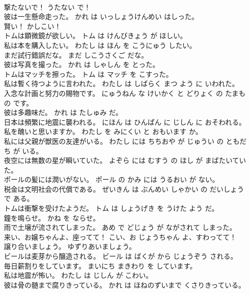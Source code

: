 \documentclass[8pt]{extreport}
\begin{document}
\begin{CJK}{UTF8}{min}
\\	撃たないで！	うたない で！	
\\	彼は一生懸命走った。	かれ は いっしょうけんめい はしった。	
\\	賢い！	かしこい！	
\\	トムは顕微鏡が欲しい。	トム は けんびきょう が ほしい。	
\\	私は本を購入したい。	わたし は ほん を こうにゅう したい。	
\\	まだ試行錯誤だな。	まだ しこうさくご だな。	
\\	彼は写真を撮った。	かれ は しゃしん を とった。	
\\	トムはマッチを擦った。	トム は マッチ を こすった。	
\\	私は暫く待つように言われた。	わたし は しばらく まつ よう に いわれた。	
\\	入念な計画と努力の賜物です。	にゅうねん な けいかく と どりょく の たまもの です。	
\\	彼は多趣味だ。	かれ は たしゅみ だ。	
\\	日本は頻繁に地震に襲われる。	にほん は ひんぱん に じしん に おそわれる。	
\\	私を醜いと思いますか。	わたし を みにくい と おもいます か。	
\\	私には父親が獣医の友達がいる。	わたし には ちちおや が じゅうい の ともだち が いる。	
\\	夜空には無数の星が瞬いていた。	よぞら には むすう の ほし が まばたいていた。	
\\	ポールの髪には潤いがない。	ポール の かみ には うるおい が ない。	
\\	税金は文明社会の代償である。	ぜいきん は ぶんめい しゃかい の だいしょう で ある。	
\\	トムは衝撃を受けたようだ。	トム は しょうげき を うけた よう だ。	
\\	鐘を鳴らせ。	かね を ならせ。	
\\	雨で土壌が流されてしまった。	あめ で どじょう が ながされて しまった。	
\\	来い、お嬢ちゃんよ、座ってて！	こい、お じょうちゃん よ、すわってて！	
\\	譲り合いましょう。	ゆずりあいましょう。	
\\	ビールは麦芽から醸造される。	ビール は ばくが から じょうぞう される。	
\\	毎日薪割りをしています。	まいにち まきわり を しています。	
\\	私は地震が怖い。	わたし は じしん が こわい。	
\\	彼は骨の髄まで腐りきっている。	かれ は ほねのずいまで くさりきっている。	

\end{CJK}
\end{document}
